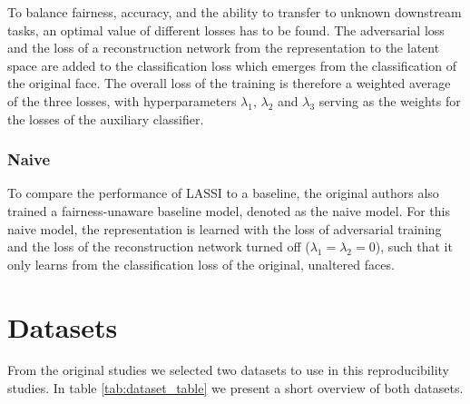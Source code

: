 
To balance fairness, accuracy, and the ability to transfer to unknown downstream tasks, an optimal value of different losses has to be found. The adversarial loss and the loss of a reconstruction network from the representation to the latent space are added to the classification loss which emerges from the classification of the original face. The overall loss of the training is therefore a weighted average of the three losses, with hyperparameters $\lambda_1$, $\lambda_2$ and $\lambda_3$ serving as the weights for the losses of the auxiliary classifier.

\subsubsection{Naive}

To compare the performance of LASSI to a baseline, the original authors also trained a fairness-unaware baseline model, denoted as the naive model. For this naive model, the representation is learned with the loss of adversarial training and the loss of the reconstruction network turned off ($\lambda_1 = \lambda_2 = 0$), such that it only learns from the classification loss of the original, unaltered faces.

\section{Datasets}
\label{subsec: appendix_2}

From the original studies we selected two datasets to use in this reproducibility studies. In table \ref{tab:dataset_table} we present a short overview of both datasets.


